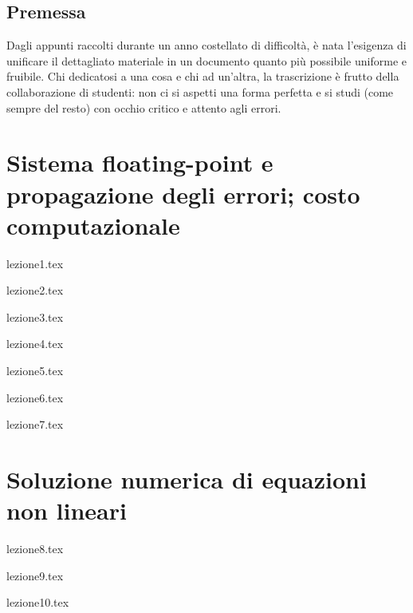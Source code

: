 \documentclass[12pt,a4paper,headings=optiontohead]{scrbook}
\begin{document}
\begin{center}
\pagebreak

\section*{Premessa}
\begin{minipage}{0.9\textwidth} \large

Dagli appunti raccolti durante un anno costellato di difficoltà, è nata l'esigenza di unificare il dettagliato materiale in un documento quanto più possibile uniforme e fruibile. Chi dedicatosi a una cosa e chi ad un'altra, la trascrizione è frutto della collaborazione di studenti: non ci si aspetti una forma perfetta e si studi (come sempre del resto) con occhio critico e attento agli errori.

\end{minipage}

\end{center}
\pagebreak

\tableofcontents

\chapter{Sistema floating-point e propagazione degli errori; costo computazionale}

{lezione1.tex}
\newpage

{lezione2.tex}
\newpage

{lezione3.tex}
\newpage

{lezione4.tex}
\newpage

{lezione5.tex}
\newpage

{lezione6.tex}
\newpage

{lezione7.tex}
\newpage

\chapter{Soluzione numerica di equazioni non lineari}

{lezione8.tex}
\newpage

{lezione9.tex}
\newpage

{lezione10.tex}
\newpage
\end{document}
